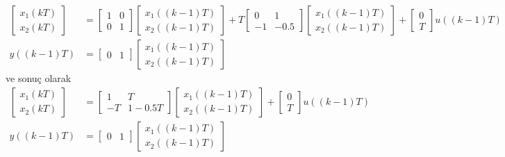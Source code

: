 \begin{equation}
    \begin{split}
        \begin{bmatrix}
            x_1(kT)\\
            x_2(kT)
        \end{bmatrix}&=
        \begin{bmatrix}
            1&0\\
            0&1
        \end{bmatrix}
        \begin{bmatrix}
            x_1((k-1)T)\\
            x_2((k-1)T)
        \end{bmatrix}+
        T\begin{bmatrix}
            0& 1\\
            -1& -0.5
        \end{bmatrix}\begin{bmatrix}
            x_1((k-1)T)\\
            x_2((k-1)T)
        \end{bmatrix}+\begin{bmatrix}
            0\\
            T
        \end{bmatrix}u((k-1)T)\\
        y((k-1)T)&=\begin{bmatrix}
            0& 1
        \end{bmatrix}\begin{bmatrix}
            x_1((k-1)T)\\
            x_2((k-1)T)
        \end{bmatrix}
    \end{split}
    \end{equation}
    ve sonuç olarak
        \begin{equation}
            \begin{split}
        \begin{bmatrix}
            x_1(kT)\\
            x_2(kT)
        \end{bmatrix}&=
        \begin{bmatrix}
            1& T\\
            -T& 1-0.5T
        \end{bmatrix}\begin{bmatrix}
            x_1((k-1)T)\\
            x_2((k-1)T)
        \end{bmatrix}+\begin{bmatrix}
            0\\
            T
        \end{bmatrix}u((k-1)T)\\
        y((k-1)T)&=\begin{bmatrix}
            0& 1
        \end{bmatrix}\begin{bmatrix}
            x_1((k-1)T)\\
            x_2((k-1)T)
        \end{bmatrix}\\
    \end{split}
\end{equation}
